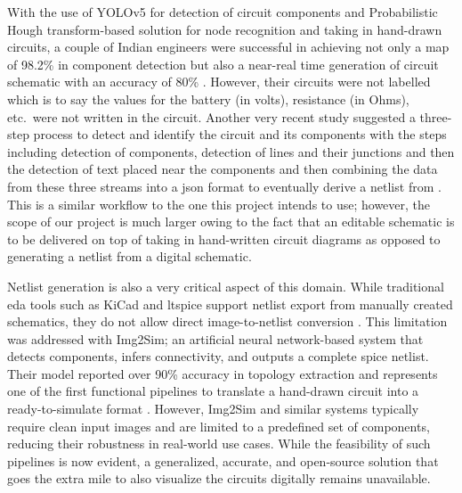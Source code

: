 With the use of YOLOv5 for detection of circuit components and Probabilistic Hough transform-based solution for node recognition and taking in hand-drawn circuits, a couple of Indian engineers were successful in achieving not only a \gls{map} of 98.2\% in component detection but also a near-real time generation of circuit schematic with an accuracy of 80\% \cite{reddy2021handdrawn}. However, their circuits were not labelled which is to say the values for the battery (in volts), resistance (in Ohms), etc.\ were not written in the circuit. Another very recent study suggested a three-step process to detect and identify the circuit and its components with the steps including detection of components, detection of lines and their junctions and then the detection of text placed near the components and then combining the data from these three streams into a \gls{json} format to eventually derive a netlist from \cite{hemker2024schematics}. This is a similar workflow to the one this project intends to use; however, the scope of our project is much larger owing to the fact that an editable schematic is to be delivered on top of taking in hand-written circuit diagrams as opposed to generating a netlist from a digital schematic.

Netlist generation is also a very critical aspect of this domain. While traditional \gls{eda} tools such as KiCad and \gls{ltspice} support netlist export from manually created schematics, they do not allow direct image-to-netlist conversion \cite{kicad2024spice}. This limitation was addressed with Img2Sim; an artificial neural network-based system that detects components, infers connectivity, and outputs a complete \gls{spice} netlist. Their model reported over 90\% accuracy in topology extraction and represents one of the first functional pipelines to translate a hand-drawn circuit into a ready-to-simulate format \cite{sertdemir2022img2sim}. However, Img2Sim and similar systems typically require clean input images and are limited to a predefined set of components, reducing their robustness in real-world use cases. While the feasibility of such pipelines is now evident, a generalized, accurate, and open-source solution that goes the extra mile to also visualize the circuits digitally remains unavailable.

